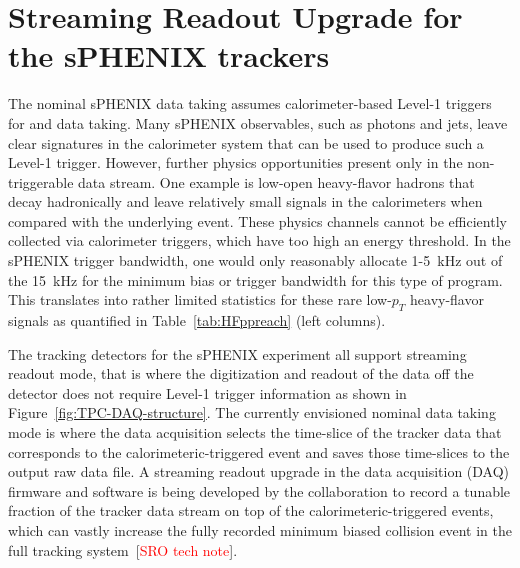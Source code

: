 
\section{Streaming Readout Upgrade for the sPHENIX trackers}

The nominal sPHENIX data taking assumes calorimeter-based Level-1 triggers for \pp and \pau data taking.  Many sPHENIX observables, such as photons and jets, leave clear signatures in the calorimeter system that can be used to produce such a Level-1 trigger. However, further physics opportunities present only in the non-triggerable data stream. One example is low-\pt open heavy-flavor hadrons that decay hadronically and leave relatively small signals in the
calorimeters when compared with the underlying event. 
These physics channels cannot be efficiently collected via calorimeter triggers, which have too high an energy threshold.
In the sPHENIX trigger
bandwidth, one would only reasonably allocate 1-5~kHz out of the 15~kHz for the
minimum bias \pp or \pau trigger bandwidth for this type of program. 
This translates into rather limited statistics for these rare low-$p_T$ heavy-flavor
signals as quantified in Table~\ref{tab:HFppreach}  (left columns).

The tracking detectors for the sPHENIX experiment all support streaming readout mode, that is where the digitization and readout of the data off the detector does not require Level-1 trigger information as shown in Figure~\ref{fig:TPC-DAQ-structure}. The currently envisioned nominal data taking mode is where the data acquisition selects the time-slice of the tracker data that  corresponds to the calorimeteric-triggered event and saves those time-slices to the output raw data file. 
A streaming readout upgrade in the data acquisition (DAQ) firmware and software is being developed by the collaboration to record a tunable fraction of the tracker data stream on top of the calorimeteric-triggered events, which can vastly increase the fully recorded minimum biased collision event in the full tracking system~[{\textcolor{red}{SRO tech note}}]. 

